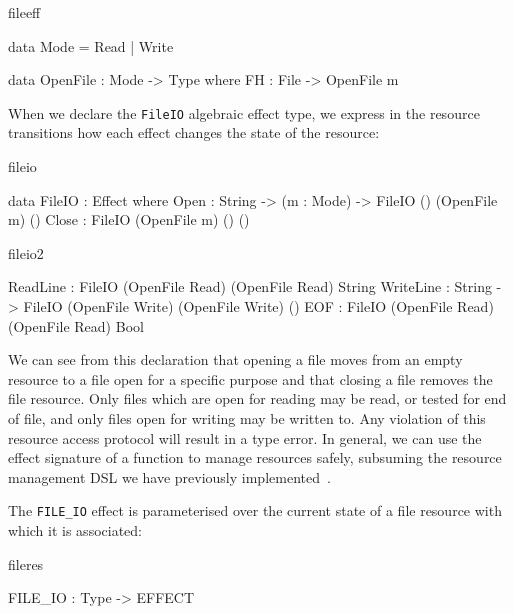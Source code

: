 \begin{SaveVerbatim}{fileeff}

data Mode = Read | Write

data OpenFile : Mode -> Type where
     FH : File -> OpenFile m

\end{SaveVerbatim}

\noindent
When we declare the \texttt{FileIO} algebraic effect type, we express in
the resource transitions how each effect changes the state of the resource:

\begin{SaveVerbatim}{fileio}

data FileIO : Effect where
     Open  : String -> (m : Mode) -> 
             FileIO () (OpenFile m) ()
     Close : FileIO (OpenFile m) () ()

\end{SaveVerbatim}

\begin{SaveVerbatim}{fileio2}

     ReadLine  : FileIO (OpenFile Read)  
                        (OpenFile Read) String
     WriteLine : String -> 
                 FileIO (OpenFile Write) 
                        (OpenFile Write) ()
     EOF       : FileIO (OpenFile Read)  
                        (OpenFile Read) Bool

\end{SaveVerbatim}

\noindent
We can see from this declaration that opening a file moves from an empty
resource to a file open for a specific purpose and that closing a file removes
the file resource. Only files which are open for reading may be read, or tested
for end of file, and only files open for writing may be written to. Any
violation of this resource access protocol will result in a type error.
In general, we can use the effect signature of a function to manage resources
safely, subsuming the resource management DSL we have previously
implemented~\cite{bradyresource}.

The \texttt{FILE\_IO} effect is parameterised over the current state of a
file resource with which it is associated:

\begin{SaveVerbatim}{fileres}

FILE_IO : Type -> EFFECT

\end{SaveVerbatim}

